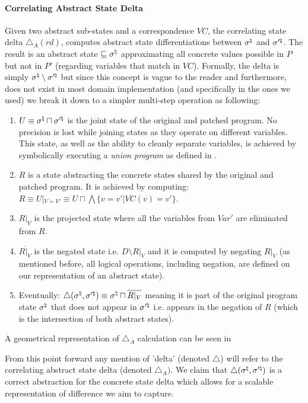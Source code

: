 \paragraph{Correlating Abstract State Delta} 
Given two abstract sub-states and a correspondence $VC$,  the correlating state delta $\triangle_{A}(rd)$, computes abstract state differentiations between $\sigma^\natural$ and $\sigma'^\natural$. The result is an abstract state $\sqsubseteq \sigma^\natural$ approximating all concrete values possible in $P$ but not in $P'$ (regarding variables that match in $VC$). Formally, the delta is simply $\sigma^\natural \setminus \sigma'^\natural$ but since this concept is vague to the reader and furthermore, does not exist in most domain implementation (and specifically in the ones we used) we break it down to a simpler multi-step operation as following:
\begin{enumerate}
\item $U \equiv \sigma^\natural \sqcap \sigma'^\natural$ is the joint state of the original and patched program. No precision is lost while joining states as they operate on different variables. This state, as well as the ability to cleanly separate variables, is achieved by symbolically executing a \emph{union program} as defined in .
\item $R$ is a state abstracting the concrete states shared by the original and patched program. It is achieved by computing: $R \equiv U|_{V=V'} \equiv U \sqcap \bigwedge\{ v = v' | VC(v) = v'\}$.
\item $R|_V$ is the projected state where all the variables from $Var'$ are eliminated from $R$.
\item $\overline{R|_V}$ is the negated state i.e. $D \setminus R|_V$ and it is computed by negating $R|_V$ (as mentioned before, all logical operations, including negation, are defined on our representation of an abstract state).
\item Eventually: $\triangle(\sigma^\natural,\sigma'^\natural) \equiv \sigma^\natural \sqcap \overline{R|_V}$ meaning it is part of the original program state $\sigma^\natural$ that does not appear in $\sigma'^\natural$ i.e. appears in the negation of $R$ (which is the intersection of both abstract states).
\end{enumerate}




A geometrical representation of $\triangle_{A}$ calculation can be seen in \figref{}

From this point forward any mention of 'delta' (denoted $\triangle$) will refer to the correlating abstract state delta (denoted $\triangle_{A})$. We claim that $\triangle(\sigma^\natural,\sigma'^\natural)$ is a correct abstraction for the concrete state delta which allows for a scalable representation of difference we aim to capture.
